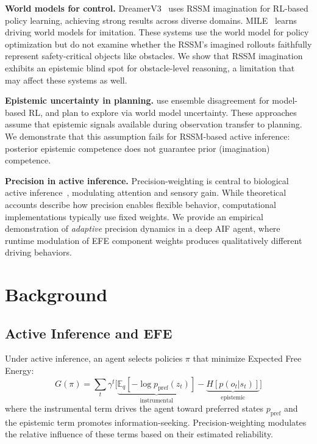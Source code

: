 \documentclass{article}
\begin{document}
\textbf{World models for control.}
DreamerV3~\citep{hafner2023mastering} uses RSSM imagination for
RL-based policy learning, achieving strong results across diverse
domains. MILE~\citep{hu2022model} learns driving world models for
imitation. These systems use the world model for policy
optimization but do not examine whether the RSSM's imagined
rollouts faithfully represent safety-critical objects like
obstacles. We show that RSSM imagination exhibits an epistemic
blind spot for obstacle-level reasoning, a limitation that may
affect these systems as well.

\textbf{Epistemic uncertainty in planning.}
\citet{chua2018deep} use ensemble disagreement for model-based RL,
and \citet{sekar2020planning} plan to explore via world model
uncertainty. These approaches assume that epistemic signals
available during observation transfer to planning. We demonstrate
that this assumption fails for RSSM-based active inference:
posterior epistemic competence does not guarantee prior
(imagination) competence.

\textbf{Precision in active inference.}
Precision-weighting is central to biological active
inference~\citep{parr2022active}, modulating attention and sensory
gain. While theoretical accounts describe how precision enables
flexible behavior, computational implementations typically use
fixed weights. We provide an empirical demonstration of
\emph{adaptive} precision dynamics in a deep AIF agent, where
runtime modulation of EFE component weights produces qualitatively
different driving behaviors.

\section{Background}

\subsection{Active Inference and EFE}

Under active inference, an agent selects policies $\pi$ that
minimize Expected Free Energy:
\begin{equation}
    G(\pi) = \sum_t \gamma^t \Big[
        \underbrace{\mathbb{E}_q[-\log p_{\text{pref}}(z_t)]}_{\text{instrumental}}
        - \underbrace{H[p(o_t | s_t)]}_{\text{epistemic}}
    \Big]
\end{equation}
where the instrumental term drives the agent toward preferred
states $p_{\text{pref}}$ and the epistemic term promotes
information-seeking. Precision-weighting modulates the relative
influence of these terms based on their estimated reliability.
\end{document}
